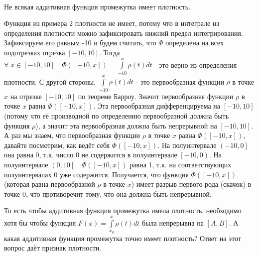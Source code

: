 \documentclass[../main.tex]{subfiles}
\begin{document}
\begin{remark}

    ~

    Не всякая аддитивная функция промежутка имеет плотность. 
    
    Функция из примера 2 плотности не имеет, потому что в интеграле из определения плотности можно зафиксировать нижний предел
    интегрирования. Зафиксируем его равным -10 и будем считать, что \( \Phi\) определена на всех подотрезках отрезка \( \left[ -10, 10\right]\). Тогда \( \forall \;x\in \left[ -10, 10\right]\quad \Phi (\left[ -10,x\right])= \displaystyle\int\limits_{ -10}^{ x} \rho (t)dt\) - 
    это верно из определения плотности. С другой стороны, \( \displaystyle\int\limits_{-10}^{ x} \rho (t)dt\) - это первообразная функции \( \rho\) в точке \( x\) на отрезке \( \left[ -10,10\right]\) по теореме Барроу. Значит первообразная функции \( \rho\) в точке \( x\) равна \( \Phi \left( \left[ -10,x\right]\right)\). Эта первообразная дифференцируема на \( \left[ -10,10\right]\)
    (потому что её производной по определению первообразной должна быть функция \( \rho\)), а значит эта первообразная должна быть непрерывной на \( \left[ -10, 10\right]\). А раз мы знаем, что первообразная функции \( \rho\) в точке \( x\) равна \( \Phi \left( \left[ -10, x\right]\right)\), давайте посмотрим, как ведёт себя \( \Phi\left( \left[ -10,x\right]\right) \).
    На полуинтервале \( \left( -10, 0\right]\) она равна 0, т.к. число 0 не содержится в полуинтервале \(\left[ -10, 0\right)\). На полуинтервале \( \left( 0, 10\right]\quad\Phi \left( \left[ -10, x\right]\right)\) равна 1, т.к. на соответствующих полуинтервалах 0 уже содержится. 
    Получается, что функция \( \Phi \left( [-10,x]\right)\) (которая равна первообразной \( \rho\) в точке \( x\)) имеет разрыв первого рода (скачок) в точке 0, что противоречит тому, что она должна быть непрерывной. 

    То есть чтобы аддитивная функция промежутка имела плотность, необходимо хотя бы чтобы функция \( F(x) = \displaystyle\int\limits_{ x_{ 0}}^{ x} \rho (t)dt\) была непрерывна на \( \left[ A,B\right]\). А какая аддитивная функция промежутка точно имеет плотность? Ответ на 
    этот вопрос даёт признак плотности.
\end{remark}
\end{document}
